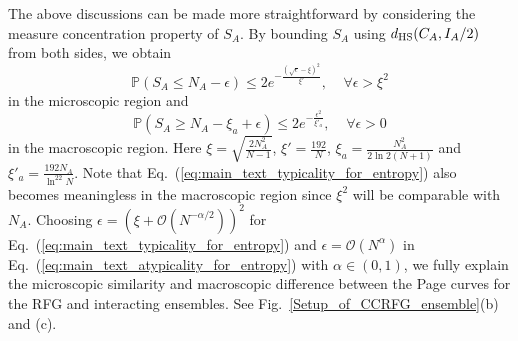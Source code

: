 \documentclass[twocolumn,english,prl,aps,superscriptaddress,amsmath,amssymb,floatfix]{revtex4-2}
\begin{document}
The above discussions can be made more straightforward %
by considering the measure concentration property of %
$S_{A}$. By bounding $S_A$ using $d_{\rm HS}(C_A,I_A/2)$ from both sides, we obtain \cite{SM} %
\begin{equation}
\mathbb{P}(S_{A}\leq N_{A}-\epsilon)\le2e^{-\frac{(\sqrt{\epsilon}-\xi)^{2}}{\xi'}},\;\;\;\;\forall\epsilon>\xi^2
\label{eq:main_text_typicality_for_entropy}
\end{equation}
in the microscopic region and
\begin{equation}
\mathbb{P}(S_{A}\geq N_{A}-\xi_{a}+\epsilon) \leq2e^{-\frac{\epsilon^{2}}{\xi'_{a}}},\;\;\;\;
\forall\epsilon>0
\label{eq:main_text_atypicality_for_entropy}
\end{equation}
in the macroscopic region. Here $\xi=\sqrt{\frac{2N_{A}^{2}}{N-1}}$, $\xi'=\frac{192}{N}$, $\xi_{a}=\frac{N_{A}^{2}}{2\ln2(N+1)}$ and $\xi'_{a}=\frac{192N_{A}}{\ln^22N}$. 
Note that Eq.~(\ref{eq:main_text_typicality_for_entropy}) also becomes meaningless in the macroscopic region since $\xi^2$ will be comparable with $N_A$.
Choosing $\epsilon=(\xi+\mathcal{O}(N^{-\alpha/2}))^2$ for Eq.~(\ref{eq:main_text_typicality_for_entropy}) and $\epsilon=\mathcal{O}(N^\alpha)$ in Eq.~(\ref{eq:main_text_atypicality_for_entropy}) with $\alpha\in(0,1)$, we fully explain the microscopic similarity and macroscopic difference %
between %
the Page curves for the %
RFG and interacting ensembles. %
See Fig.~\ref{Setup_of_CCRFG_ensemble}(b) and (c).
\end{document}
